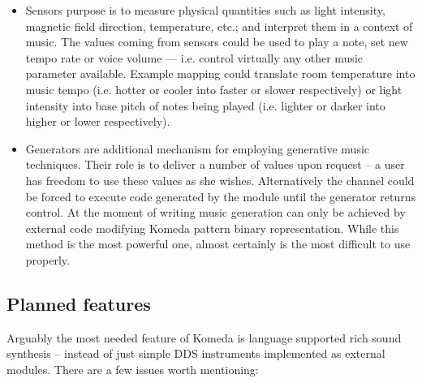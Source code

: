 \documentclass{article}
\begin{document}
\begin{itemize}
    \setlength{\itemsep}{0pt}
  \item Sensors purpose is to measure physical quantities such as light
    intensity, magnetic field direction, temperature, etc.; and interpret them
    in a context of music. The values coming from sensors could be used to play
    a note, set new tempo rate or voice volume --- i.e. control virtually any
    other music parameter available. Example mapping could translate room
    temperature into music tempo (i.e. hotter or cooler into faster or slower
    respectively) or light intensity into base pitch of notes being played
    (i.e. lighter or darker into higher or lower respectively).

  \item Generators are additional mechanism for employing generative music
    techniques. Their role is to deliver a number of values upon request -- a
    user has freedom to use these values as she wishes. Alternatively the
    channel could be forced to execute code generated by the module until the
    generator returns control. At the moment of writing music generation can
    only be achieved by external code modifying Komeda pattern binary
    representation. While this method is the most powerful one, almost
    certainly is the most difficult to use properly. 
\end{itemize}

\subsection{Planned features}

Arguably the most needed feature of Komeda is language supported rich sound
synthesis -- instead of just simple DDS instruments implemented as external
modules. There are a few issues worth mentioning:
\end{document}
